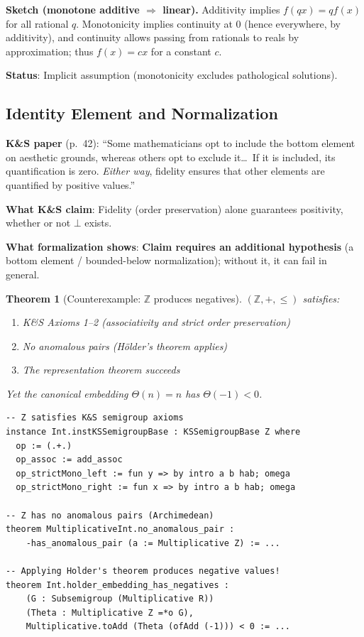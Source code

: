 \documentclass[11pt]{article}
\newtheorem{theorem}{Theorem}[section]
\begin{document}
\textbf{Sketch (monotone additive $\Rightarrow$ linear).}
Additivity implies $f(qx)=qf(x)$ for all rational $q$.
Monotonicity implies continuity at $0$ (hence everywhere, by additivity), and continuity allows
passing from rationals to reals by approximation; thus $f(x)=cx$ for a constant $c$.

\textbf{Status}: Implicit assumption (monotonicity excludes pathological solutions).

\subsection{Identity Element and Normalization}

\textbf{K\&S paper} (p.~42): ``Some mathematicians opt to include the bottom element
on aesthetic grounds, whereas others opt to exclude it\ldots\ If it is included, its
quantification is zero. \emph{Either way}, fidelity ensures that other elements are
quantified by positive values.''

\textbf{What K\&S claim}: Fidelity (order preservation) alone guarantees positivity,
whether or not $\bot$ exists.

\textbf{What formalization shows}: \textbf{Claim requires an additional hypothesis}
(a bottom element / bounded-below normalization); without it, it can fail in general.

\begin{theorem}[Counterexample: $\mathbb{Z}$ produces negatives]
$(\mathbb{Z}, +, \leq)$ satisfies:
\begin{enumerate}[noitemsep]
\item K\&S Axioms 1--2 (associativity and strict order preservation)
\item No anomalous pairs (H\"{o}lder's theorem applies)
\item The representation theorem succeeds
\end{enumerate}
Yet the canonical embedding $\Theta(n) = n$ has $\Theta(-1) < 0$.
\end{theorem}

\begin{lstlisting}[language=lean,caption={Counterexample: $\mathbb{Z}$ embedding has negatives.}]
-- Z satisfies K&S semigroup axioms
instance Int.instKSSemigroupBase : KSSemigroupBase Z where
  op := (.+.)
  op_assoc := add_assoc
  op_strictMono_left := fun y => by intro a b hab; omega
  op_strictMono_right := fun x => by intro a b hab; omega

-- Z has no anomalous pairs (Archimedean)
theorem MultiplicativeInt.no_anomalous_pair :
    -has_anomalous_pair (a := Multiplicative Z) := ...

-- Applying Holder's theorem produces negative values!
theorem Int.holder_embedding_has_negatives :
    (G : Subsemigroup (Multiplicative R))
    (Theta : Multiplicative Z =*o G),
    Multiplicative.toAdd (Theta (ofAdd (-1))) < 0 := ...
\end{lstlisting}
\end{document}
